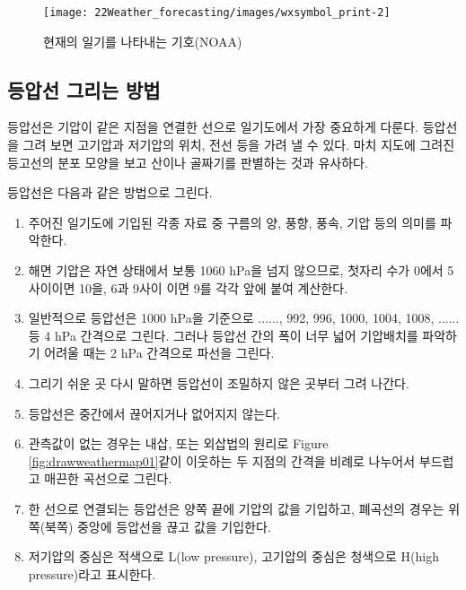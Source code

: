 \begin{figure}[p]
	\centering
	\texttt{[image: 22Weather\_forecasting/images/wxsymbol\_print-2]}
	\caption{현재의 일기를 나타내는 기호(NOAA)}
	\label{fig:drawsymbols-2}
\end{figure}


\newpage
\subsection{등압선 그리는 방법}
등압선은 기압이 같은 지점을 연결한 선으로 일기도에서 가장 중요하게 다룬다. 등압선을 그려 보면 고기압과 저기압의 위치, 전선 등을 가려 낼 수 있다. 마치 지도에 그려진 등고선의 분포 모양을 보고 산이나 골짜기를 판별하는 것과 유사하다. 

등압선은 다음과 같은 방법으로 그린다.
\begin{enumerate}
 \item 주어진 일기도에 기입된 각종 자료 중 구름의 양, 풍향, 풍속, 기압 등의 의미를 파악한다. 
 \item 해면 기압은 자연 상태에서 보통 1060 hPa을 넘지 않으므로, 첫자리 수가 0에서 5사이이면 10을, 6과 9사이 이면 9를 각각 앞에 붙여 계산한다.
 \item 일반적으로 등압선은 1000 hPa을 기준으로 ......, 992, 996, 1000, 1004, 1008, ...... 등 4 hPa 간격으로 그린다. 그러나 등압선 간의 폭이 너무 넓어 기압배치를 파악하기 어려울 때는 2 hPa 간격으로 파선을 그린다.
 \item 그리기 쉬운 곳 다시 말하면 등압선이 조밀하지 않은 곳부터 그려 나간다.
 \item 등압선은 중간에서 끊어지거나 없어지지 않는다.
 \item 관측값이 없는 경우는 내삽, 또는 외삽법의 원리로 Figure \ref{fig:drawweathermap01}\과 같이 이웃하는 두 지점의 간격을 비례로 나누어서 부드럽고 매끈한 곡선으로 그린다.
 \item 한 선으로 연결되는 등압선은 양쪽 끝에 기압의 값을 기입하고, 폐곡선의 경우는 위쪽(북쪽) 중앙에 등압선을 끊고 값을 기입한다. 
 \item 저기압의 중심은 적색으로 L(low pressure), 고기압의 중심은 청색으로 H(high pressure)라고 표시한다.
\end{enumerate}

